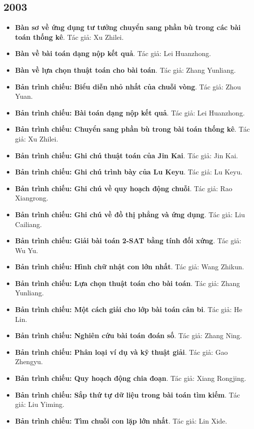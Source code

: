 \documentclass[11pt]{article}
\begin{document}
\subsection{2003}
\begin{itemize}[leftmargin=2em]
  \item \textbf{Bàn sơ về ứng dụng tư tưởng chuyển sang phần bù trong các bài toán thống kê}. Tác giả: Xu Zhilei.
  \item \textbf{Bàn về bài toán dạng nộp kết quả}. Tác giả: Lei Huanzhong.
  \item \textbf{Bàn về lựa chọn thuật toán cho bài toán}. Tác giả: Zhang Yunliang.
  \item \textbf{Bản trình chiếu: Biểu diễn nhỏ nhất của chuỗi vòng}. Tác giả: Zhou Yuan.
  \item \textbf{Bản trình chiếu: Bài toán dạng nộp kết quả}. Tác giả: Lei Huanzhong.
  \item \textbf{Bản trình chiếu: Chuyển sang phần bù trong bài toán thống kê}. Tác giả: Xu Zhilei.
  \item \textbf{Bản trình chiếu: Ghi chú thuật toán của Jin Kai}. Tác giả: Jin Kai.
  \item \textbf{Bản trình chiếu: Ghi chú trình bày của Lu Keyu}. Tác giả: Lu Keyu.
  \item \textbf{Bản trình chiếu: Ghi chú về quy hoạch động chuỗi}. Tác giả: Rao Xiangrong.
  \item \textbf{Bản trình chiếu: Ghi chú về đồ thị phẳng và ứng dụng}. Tác giả: Liu Cailiang.
  \item \textbf{Bản trình chiếu: Giải bài toán 2-SAT bằng tính đối xứng}. Tác giả: Wu Yu.
  \item \textbf{Bản trình chiếu: Hình chữ nhật con lớn nhất}. Tác giả: Wang Zhikun.
  \item \textbf{Bản trình chiếu: Lựa chọn thuật toán cho bài toán}. Tác giả: Zhang Yunliang.
  \item \textbf{Bản trình chiếu: Một cách giải cho lớp bài toán cân bi}. Tác giả: He Lin.
  \item \textbf{Bản trình chiếu: Nghiên cứu bài toán đoán số}. Tác giả: Zhang Ning.
  \item \textbf{Bản trình chiếu: Phân loại ví dụ và kỹ thuật giải}. Tác giả: Gao Zhengyu.
  \item \textbf{Bản trình chiếu: Quy hoạch động chia đoạn}. Tác giả: Xiang Rongjing.
  \item \textbf{Bản trình chiếu: Sắp thứ tự dữ liệu trong bài toán tìm kiếm}. Tác giả: Liu Yiming.
  \item \textbf{Bản trình chiếu: Tìm chuỗi con lặp lớn nhất}. Tác giả: Lin Xide.

\end{itemize}
\end{document}
